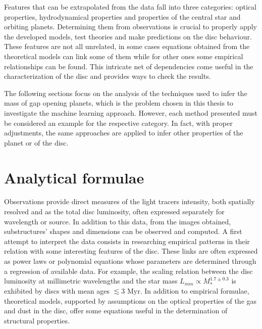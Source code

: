 \documentclass[a4paper,10pt]{report}
\begin{document}
Features that can be extrapolated from the data fall into three categories: optical properties, hydrodynamical properties
and properties of the central star and orbiting planets.
Determining them from observations is crucial
to properly apply the developed models, test theories and make predictions on the disc behaviour.
These features are not all unrelated, in some cases equations obtained from the theoretical
models can link some of them while for other ones some empirical relationships can be found.
This intricate net of dependencies come useful in the characterization of the disc and provides 
ways to check the results.

The following sections focus on the analysis of the
techniques used to infer the mass of gap opening planets, which is
the problem chosen in this thesis to investigate the machine learning approach.
However, each method presented must be considered an example for the respective category. 
In fact, with proper adjustments, the same approaches are
applied to infer other properties of the planet or of the disc.

\section{Analytical formulae}

Observations provide direct measures of the light tracers intensity, both spatially resolved and as
the total disc luminosity, often expressed separately for wavelength or source.
In addition to this data, from the images obtained, substructures' shapes and
dimensions can be observed and computed.
A first attempt to interpret the data consists in researching empirical patterns in their relation with some
interesting features of the disc. These links are often expressed as power laws or polynomial equations whose parameters are
determined through a regression of available data.
For example, the scaling relation between the disc luminosity at millimetric wavelengths and the star mass $L_{mm} \propto M_*^{1.7\pm0.3}$
is exhibited by discs with mean ages $\lesssim 3$ Myr.
In addition to empirical formulae, theoretical models, supported by assumptions on
the optical properties of the gas and dust in the disc, offer some equations useful
in the determination of structural properties.
\end{document}
